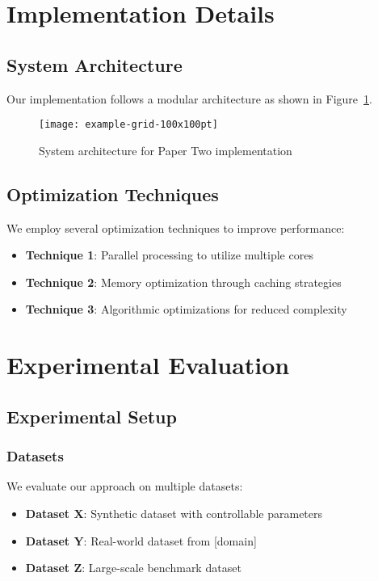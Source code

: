 \section{Implementation Details}

\subsection{System Architecture}

Our implementation follows a modular architecture as shown in Figure~\ref{fig:papertwo-architecture}.

\begin{figure}[!htb]
    \centering
    \texttt{[image: example-grid-100x100pt]}
    \caption{System architecture for Paper Two implementation}
    \label{fig:papertwo-architecture}
\end{figure}

\subsection{Optimization Techniques}

We employ several optimization techniques to improve performance:
\begin{itemize}
    \item \textbf{Technique 1}: Parallel processing to utilize multiple cores
    \item \textbf{Technique 2}: Memory optimization through caching strategies
    \item \textbf{Technique 3}: Algorithmic optimizations for reduced complexity
\end{itemize}

\section{Experimental Evaluation}

\subsection{Experimental Setup}

\subsubsection{Datasets}
We evaluate our approach on multiple datasets:
\begin{itemize}
    \item \textbf{Dataset X}: Synthetic dataset with controllable parameters
    \item \textbf{Dataset Y}: Real-world dataset from [domain]
    \item \textbf{Dataset Z}: Large-scale benchmark dataset
\end{itemize}


